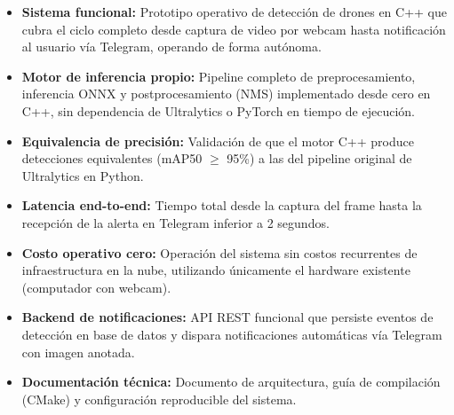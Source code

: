 \documentclass[sigconf,nonacm]{acmart}
\begin{document}
\begin{itemize}
\item \textbf{Sistema funcional:} Prototipo operativo de detección de drones en C++ que cubra el ciclo completo desde captura de video por webcam hasta notificación al usuario vía Telegram, operando de forma autónoma.
\item \textbf{Motor de inferencia propio:} Pipeline completo de preprocesamiento, inferencia ONNX y postprocesamiento (NMS) implementado desde cero en C++, sin dependencia de Ultralytics o PyTorch en tiempo de ejecución.
\item \textbf{Equivalencia de precisión:} Validación de que el motor C++ produce detecciones equivalentes (mAP50 $\geq$ 95\%) a las del pipeline original de Ultralytics en Python.
\item \textbf{Latencia end-to-end:} Tiempo total desde la captura del frame hasta la recepción de la alerta en Telegram inferior a 2 segundos.
\item \textbf{Costo operativo cero:} Operación del sistema sin costos recurrentes de infraestructura en la nube, utilizando únicamente el hardware existente (computador con webcam).
\item \textbf{Backend de notificaciones:} API REST funcional que persiste eventos de detección en base de datos y dispara notificaciones automáticas vía Telegram con imagen anotada.
\item \textbf{Documentación técnica:} Documento de arquitectura, guía de compilación (CMake) y configuración reproducible del sistema.
\end{itemize}
\end{document}
